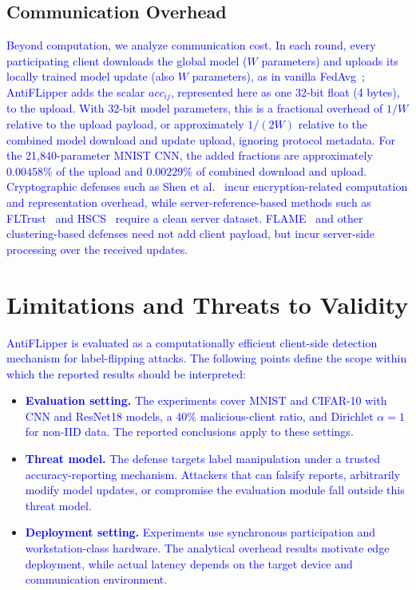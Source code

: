\documentclass[conference]{IEEEtran}
\begin{document}
\subsection{Communication Overhead}
\textcolor{blue}{Beyond computation, we analyze communication cost. In each round, every participating client downloads the global model ($W$ parameters) and uploads its locally trained model update (also $W$ parameters), as in vanilla FedAvg~\cite{fedavg-pmlr-v54-mcmahan17a}; AntiFLipper adds the scalar $acc_{ij}$, represented here as one 32-bit float (4 bytes), to the upload. With 32-bit model parameters, this is a fractional overhead of $1/W$ relative to the upload payload, or approximately $1/(2W)$ relative to the combined model download and update upload, ignoring protocol metadata. For the 21,840-parameter MNIST CNN, the added fractions are approximately $0.00458\%$ of the upload and $0.00229\%$ of combined download and upload. Cryptographic defenses such as Shen et al.~\cite{shen2024lfrppfl} incur encryption-related computation and representation overhead, while server-reference-based methods such as FLTrust~\cite{cao2020fltrust} and HSCS~\cite{li2023hscs} require a clean server dataset. FLAME~\cite{nguyen2022flame} and other clustering-based defenses need not add client payload, but incur server-side processing over the received updates.}


\section{Limitations and Threats to Validity}
\label{sec:limitations}
\textcolor{blue}{AntiFLipper is evaluated as a computationally efficient client-side detection mechanism for label-flipping attacks. The following points define the scope within which the reported results should be interpreted:}

\begin{itemize}
    \item \textcolor{blue}{\textbf{Evaluation setting.} The experiments cover MNIST and CIFAR-10 with CNN and ResNet18 models, a 40\% malicious-client ratio, and Dirichlet $\alpha=1$ for non-IID data. The reported conclusions apply to these settings.}
    \item \textcolor{blue}{\textbf{Threat model.} The defense targets label manipulation under a trusted accuracy-reporting mechanism. Attackers that can falsify reports, arbitrarily modify model updates, or compromise the evaluation module fall outside this threat model.}
    \item \textcolor{blue}{\textbf{Deployment setting.} Experiments use synchronous participation and workstation-class hardware. The analytical overhead results motivate edge deployment, while actual latency depends on the target device and communication environment.}
\end{itemize}
\end{document}
